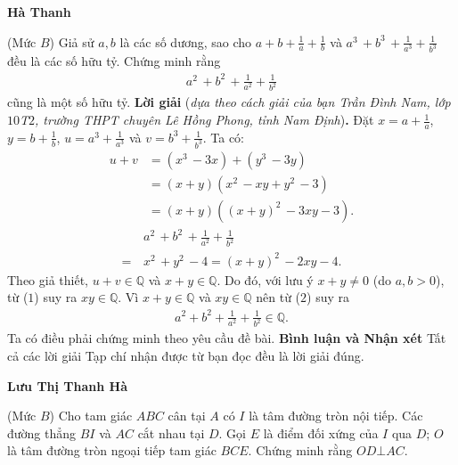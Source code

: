 \begin{multicols}{2}
	\begin{flushright}
		\textbf{\color{thachthuctoanhoc}Hà Thanh}
	\end{flushright}
	{\color{thachthuctoanhoc}{\usefont{T5}{qag}{b}{n} P583.}}
	(Mức $B$) Giả sử $a, b$ là các số dương, sao cho $a + b + \frac{1}{a} + \frac{1}{b}$ và  ${a^3}\, + {b^3}\, + \frac{1}{{{a^3}}} + \frac{1}{{{b^3}}}$ đều là các số hữu tỷ. Chứng minh rằng
	\begin{align*}
		{a^2}\, + {b^2}\, + \frac{1}{{{a^2}}} + \frac{1}{{{b^2}}}
	\end{align*}
	cũng là một số hữu tỷ.
	\vskip 0.05cm
	\textbf{\color{thachthuctoanhoc}Lời giải} (\textit{dựa theo cách giải của bạn Trần Đình Nam, lớp $10$T$2$, trường THPT chuyên Lê Hồng Phong, tỉnh Nam Định})\textbf{\color{thachthuctoanhoc}.}
	\vskip 0.05cm
	Đặt  $x = a + \frac{1}{a}$,  $y = b + \frac{1}{b}$, $u = a^3 + \frac{1}{a^3}$  và  $v = b^3 + \frac{1}{b^3}$.
	\vskip 0.05cm
	Ta có:
	\begin{align*}
		u + v &= \left( {{x^3}\, - 3x} \right) + \left( {{y^3}\, - 3y} \right) \\
		&= \left( {x + y} \right)\left( {{x^2}\, - xy + {y^2}\, - 3} \right)\\
		&= \left( {x + y} \right)\left( {{{\left( {x + y} \right)}^2}\, - 3xy - 3} \right). \tag{$1$}
	\end{align*}
	\begin{align*}
		&{a^2}\, + {b^2}\, + \frac{1}{{{a^2}}} + \frac{1}{{{b^2}}} \\
		= \,&{x^2}\, + {y^2}\, - 4 = {\left( {x + y} \right)^2}\, - 2xy - 4. \tag{$2$}
	\end{align*}
	Theo giả thiết, $u+ v \in \mathbb{Q}$ và  $x + y\in \mathbb{Q}$. Do đó, với lưu ý $x+y \ne 0$ (do $a, b > 0$), từ ($1$) suy ra  $xy \in \mathbb{Q}$.
	\vskip 0.05cm
	Vì $x + y \in \mathbb{Q}$  và $xy \in \mathbb{Q}$  nên từ ($2$) suy ra
	\begin{align*}
		a^2 + b^2 + \frac{1}{a^2} + \frac{1}{b^2} \in \mathbb{Q}.
	\end{align*}
	Ta có điều phải chứng minh theo yêu cầu đề bài.
	\vskip 0.05cm
	\textbf{\color{thachthuctoanhoc}Bình luận và Nhận xét}
	\vskip 0.05cm
	Tất cả các lời giải Tạp chí nhận được từ bạn đọc đều là lời giải đúng.
	\begin{flushright}
		\textbf{\color{thachthuctoanhoc}Lưu Thị Thanh Hà}
	\end{flushright}
	{}
	(Mức $B$) Cho tam giác $ABC$ cân tại $A$ có $I$ là tâm đường tròn nội tiếp. Các đường thẳng $BI$ và $AC$ cắt nhau tại $D$. Gọi $E$ là điểm đối xứng của $I$ qua $D$; $O$ là tâm đường tròn ngoại tiếp tam giác $BCE$. Chứng minh rằng $OD\bot AC$.

\end{multicols}
